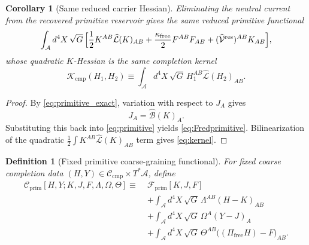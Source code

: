 \documentclass[11pt]{article}
\newcommand{\Sub}{\mathcal A}
\newcommand{\ResidualLift}{\widehat{\mathcal V}^{\mathrm{res}}}
\newcommand{\SubGaugeVec}{\widehat{\mathcal B}}
\newcommand{\SubReducedEin}{\widehat{\mathcal L}}
\newcommand{\FreeProj}{\Pi_{\mathrm{free}}}
\newcommand{\GaugeAux}{Y}
\newcommand{\CompClass}{\mathscr C_{\mathrm{cmp}}}
\newcommand{\CompKernel}{\mathscr K_{\mathrm{cmp}}}
\newcommand{\PrimFunctional}{\mathscr F_{\mathrm{prim}}}
\newcommand{\FreeStiff}{\kappa_{\mathrm{free}}}
\newcommand{\PrimStrain}{K}
\newcommand{\PrimNeutral}{J}
\newcommand{\PrimFree}{F}
\newcommand{\StrainMult}{\Lambda}
\newcommand{\NeutralMult}{\Omega}
\newcommand{\FreeMult}{\Theta}
\newtheorem{definition}{Definition}
\newtheorem{corollary}{Corollary}
\begin{document}
\begin{corollary}[Same reduced carrier Hessian]
\label{cor:hessian}
Eliminating the neutral current from the recovered primitive reservoir gives the same reduced primitive functional
\begin{equation}
\begin{aligned}
\int_{\Sub} d^4X\,\sqrt{G}\,
\Bigl[
\frac12 \PrimStrain^{AB}\SubReducedEin(\PrimStrain)_{AB}
+\frac{\FreeStiff}{2}\PrimFree^{AB}\PrimFree_{AB}
+(\ResidualLift)^{AB}\PrimStrain_{AB}
\Bigr],
\end{aligned}
\label{eq:Fredprimitive}
\end{equation}
whose quadratic \(\PrimStrain\)-Hessian is the same completion kernel
\begin{equation}
\CompKernel(H_1,H_2)
\equiv
\int_{\Sub} d^4X\,\sqrt{G}\,
H_1^{AB}\SubReducedEin(H_2)_{AB}.
\label{eq:kernel}
\end{equation}
\end{corollary}

\begin{proof}
By \eqref{eq:primitive_exact}, variation with respect to \(\PrimNeutral_A\) gives
\[
\PrimNeutral_A=\SubGaugeVec(\PrimStrain)_A.
\]
Substituting this back into \eqref{eq:primitive} yields \eqref{eq:Fredprimitive}. Bilinearization of the quadratic \(\frac12\int \PrimStrain^{AB}\SubReducedEin(\PrimStrain)_{AB}\) term gives \eqref{eq:kernel}.
\end{proof}

\begin{definition}[Fixed primitive coarse-graining functional]
\label{def:prim_cg}
For fixed coarse completion data \((H,\GaugeAux)\in\CompClass\times T^*\Sub\), define
\begin{equation}
\begin{aligned}
\mathscr C_{\mathrm{prim}}
[H,\GaugeAux;
\PrimStrain,\PrimNeutral,\PrimFree,
\StrainMult,\NeutralMult,\FreeMult]
\equiv\;
&\PrimFunctional[\PrimStrain,\PrimNeutral,\PrimFree]
\\
&+\int_{\Sub} d^4X\,\sqrt{G}\,
\StrainMult^{AB}(H-\PrimStrain)_{AB}
\\
&+\int_{\Sub} d^4X\,\sqrt{G}\,
\NeutralMult^A(\GaugeAux-\PrimNeutral)_A
\\
&+\int_{\Sub} d^4X\,\sqrt{G}\,
\FreeMult^{AB}\bigl((\FreeProj H)-\PrimFree\bigr)_{AB}.
\end{aligned}
\label{eq:Cprim}
\end{equation}
\end{definition}
\end{document}
